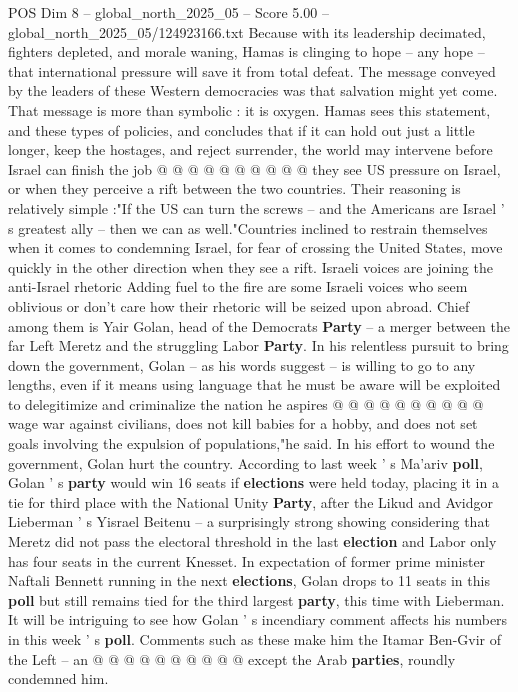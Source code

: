 \begin{textsample}{POS Dim 8 – global\_north\_2025\_05 – Score 5.00 – global\_north\_2025\_05/124923166.txt}
Because with its leadership decimated, fighters depleted, and morale waning, Hamas is clinging to hope -- any hope -- that international pressure will save it from total defeat.
The message conveyed by the leaders of these Western democracies was that salvation might yet come.
That message is more than symbolic : it is oxygen.
Hamas sees this statement, and these types of policies, and concludes that if it can hold out just a little longer, keep the hostages, and reject surrender, the world may intervene before Israel can finish the job @ @ @ @ @ @ @ @ @ @ they see US pressure on Israel, or when they perceive a rift between the two countries.
Their reasoning is relatively simple :"If the US can turn the screws -- and the Americans are Israel ' s greatest ally -- then we can as well."Countries inclined to restrain themselves when it comes to condemning Israel, for fear of crossing the United States, move quickly in the other direction when they see a rift.
Israeli voices are joining the anti-Israel rhetoric Adding fuel to the fire are some Israeli voices who seem oblivious or don't care how their rhetoric will be seized upon abroad.
Chief among them is Yair Golan, head of the Democrats \textbf{Party} -- a merger between the far Left Meretz and the struggling Labor \textbf{Party}.
In his relentless pursuit to bring down the government, Golan -- as his words suggest -- is willing to go to any lengths, even if it means using language that he must be aware will be exploited to delegitimize and criminalize the nation he aspires @ @ @ @ @ @ @ @ @ @ wage war against civilians, does not kill babies for a hobby, and does not set goals involving the expulsion of populations,"he said.
In his effort to wound the government, Golan hurt the country.
According to last week ' s Ma'ariv \textbf{poll}, Golan ' s \textbf{party} would win 16 seats if \textbf{elections} were held today, placing it in a tie for third place with the National Unity \textbf{Party}, after the Likud and Avidgor Lieberman ' s Yisrael Beitenu -- a surprisingly strong showing considering that Meretz did not pass the electoral threshold in the last \textbf{election} and Labor only has four seats in the current Knesset.
In expectation of former prime minister Naftali Bennett running in the next \textbf{elections}, Golan drops to 11 seats in this \textbf{poll} but still remains tied for the third largest \textbf{party}, this time with Lieberman.
It will be intriguing to see how Golan ' s incendiary comment affects his numbers in this week ' s \textbf{poll}.
Comments such as these make him the Itamar Ben-Gvir of the Left -- an @ @ @ @ @ @ @ @ @ @ except the Arab \textbf{parties}, roundly condemned him.

\end{textsample}
